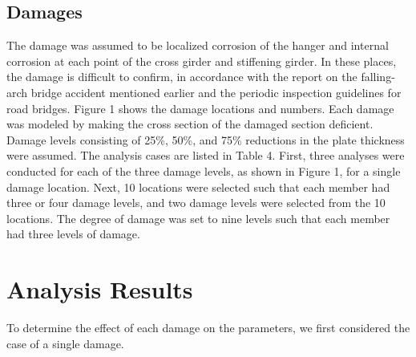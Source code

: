\documentclass{proc-a4}
\begin{document}
\subsection{Damages}
The damage was assumed to be localized corrosion of the hanger and internal corrosion at each point of the cross girder and stiffening girder. In these places, the damage is difficult to confirm, in accordance with the report on the falling-arch bridge accident mentioned earlier and the periodic inspection guidelines for road bridges. Figure 1 shows the damage locations and numbers. Each damage was modeled by making the cross section of the damaged section deficient. Damage levels consisting of 25\%, 50\%, and 75\% reductions in the plate thickness were assumed. The analysis cases are listed in Table 4. First, three analyses were conducted for each of the three damage levels, as shown in Figure 1, for a single damage location. Next, 10 locations were selected such that each member had three or four damage levels, and two damage levels were selected from the 10 locations. The degree of damage was set to nine levels such that each member had three levels of damage.
\begin{table}[ht]
\end{table}
\section{Analysis Results}
To determine the effect of each damage on the parameters, we first considered the case of a single damage.
\end{document}
